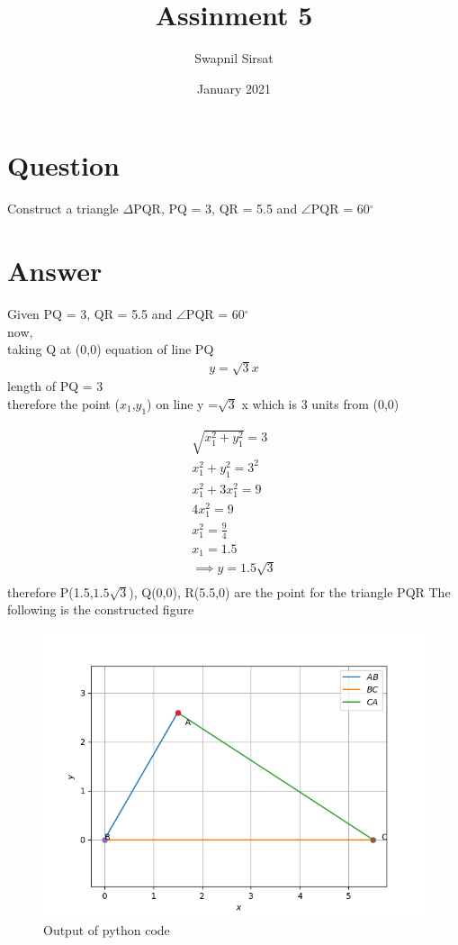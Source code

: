 \documentclass{article}
\title{Assinment 5}
\author{Swapnil Sirsat}
\date{January 2021}
\begin{document}
\maketitle

\section*{Question}
Construct a triangle $\Delta$PQR, PQ = 3, QR = 5.5 and $\angle$PQR = 60$^\circ$
\section*{Answer}
Given PQ = 3, QR = 5.5 and $\angle$PQR = 60$^\circ$ \\ 
now, \\
taking Q at (0,0)
equation of line PQ 
\begin{gather*}
    y = \sqrt{3}x
\end{gather*}
length of PQ = 3 \\
therefore the point ($x_1$,$y_1$) on line y =$\sqrt{3}$ x which is 3 units from (0,0)

\begin{gather*}
    \sqrt{x_1^{2}+y_1^{2}} = 3 \\
    x_1^{2}+y_1^{2} = 3^{2}\\
    x_1^{2}+3x_1^{2} = 9 \\
    4x_1^{2} = 9 \\
    x_1^{2} = \frac{9}{4}\\
    x_1 = 1.5\\
    \implies y = 1.5\sqrt{3}\\
\end{gather*}
therefore P(1.5,$1.5\sqrt{3}$), Q(0,0), R(5.5,0) are the point for the triangle PQR
\newpage
The following is the constructed figure
\begin{figure}[h!]
    \centering
    \includegraphics{Figure_1.png}
    \caption{Output of python code}
    \label{fig:my_label}
\end{figure}
\newpage
\newpage
\end{document}
